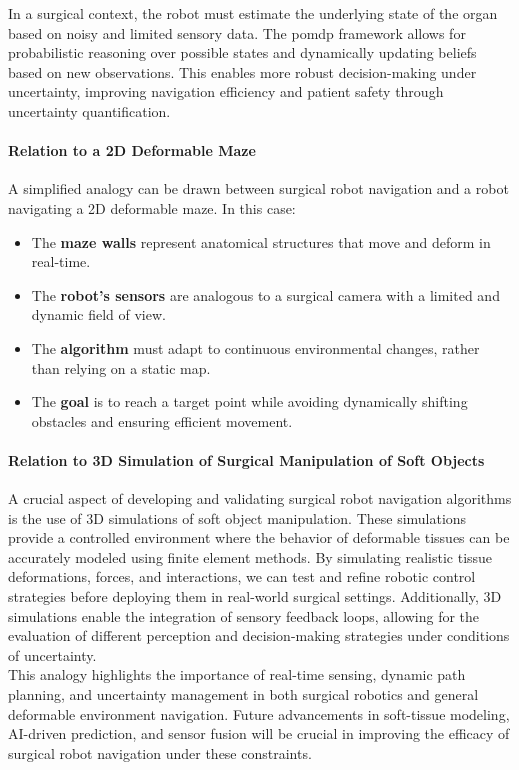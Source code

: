 In a surgical context, the robot must estimate the underlying state of the organ based on noisy and 
limited sensory data. The \gls{pomdp} framework allows for probabilistic reasoning over possible 
states and dynamically updating beliefs based on new observations. This enables more robust 
decision-making under uncertainty, improving navigation efficiency and patient safety through uncertainty 
quantification.

\paragraph{Relation to a 2D Deformable Maze}
A simplified analogy can be drawn between surgical robot navigation and a robot navigating a 2D deformable maze. In this case:
\begin{itemize}
\item The \textbf{maze walls} represent anatomical structures that move and deform in real-time.
\item The \textbf{robot's sensors} are analogous to a surgical camera with a limited and dynamic field of view.
\item The \textbf{algorithm} must adapt to continuous environmental changes, rather than relying on a static map.
\item The \textbf{goal} is to reach a target point while avoiding dynamically shifting obstacles and ensuring efficient movement.
\end{itemize}

\paragraph{Relation to 3D Simulation of Surgical Manipulation of Soft Objects}
A crucial aspect of developing and validating surgical robot navigation algorithms is the use of 3D 
simulations of soft object manipulation. These simulations provide a controlled environment where the 
behavior of deformable tissues can be accurately modeled using finite element methods. 
By simulating realistic tissue deformations, forces, and interactions, we can test and 
refine robotic control strategies before deploying them in real-world surgical settings. Additionally, 
3D simulations enable the integration of sensory feedback loops, allowing for the evaluation of 
different perception and decision-making strategies under conditions of uncertainty.\\


This analogy highlights the importance of real-time sensing, dynamic path planning, and uncertainty 
management in both surgical robotics and general deformable environment navigation. 
Future advancements in soft-tissue modeling, AI-driven prediction, and sensor fusion will be 
crucial in improving the efficacy of surgical robot navigation under these constraints.


